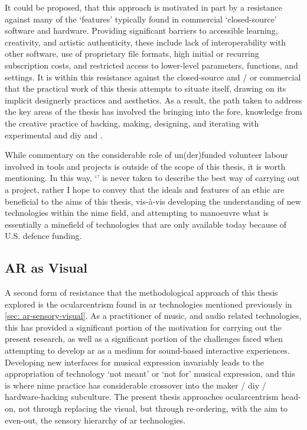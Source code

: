 It could be proposed, that this approach is motivated in part by a resistance against many of the `features' typically found in commercial `closed-source' software and hardware. Providing significant barriers to accessible learning, creativity, and artistic authenticity, these include lack of interoperability with other software, use of proprietary file formats, high initial or recurring subscription costs, and restricted access to lower-level parameters, functions, and settings. It is within this resistance against the closed-source and / or commercial that the practical work of this thesis attempts to situate itself, drawing on its implicit designerly practices and aesthetics. As a result, the path taken to address the key areas of the thesis has involved the bringing into the fore, knowledge from the creative practice of hacking, making, designing, and iterating with experimental and \gls{diy}   and .

While commentary on the considerable role of un(der)funded volunteer labour involved in  tools and projects is outside of the scope of this thesis, it is worth mentioning. In this way, `' is never taken to describe the best way of carrying out a project, rather I hope to convey that the ideals and features of an  ethic are beneficial to the aims of this thesis, vis-à-vis developing the understanding of new technologies within the \gls{nime} field, and attempting to manoeuvre what is essentially a minefield of technologies that are only available today because of U.S. defence funding.

\subsection{AR as Visual}\label{sec: method-resistance-ocularcentrism}
A second form of resistance that the methodological approach of this thesis explored is the ocularcentrism found in \gls{ar} technologies mentioned previously in \autoref{sec: ar-sensory-visual}. As a practitioner of music, and audio related technologies, this has provided a significant portion of the motivation for carrying out the present research, as well as a significant portion of the challenges faced when attempting to develop \gls{ar} as a medium for sound-based interactive experiences. Developing new interfaces for musical expression invariably leads to the appropriation of technology `not meant' or `not for' musical expression, and this is where \gls{nime} practice has considerable crossover into the maker / \gls{diy} / hardware-hacking subculture. The present thesis approaches ocularcentrism head-on, not through replacing the visual, but through re-ordering, with the aim to even-out, the sensory hierarchy of \gls{ar} technologies. 

